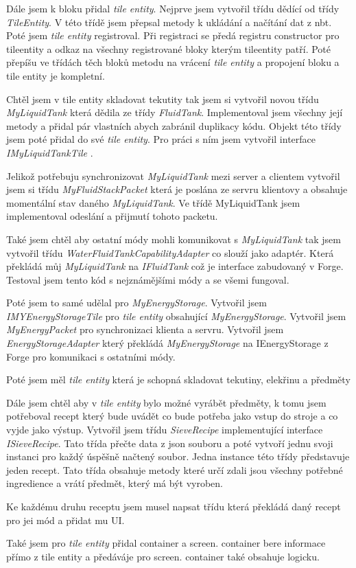 \documentclass[FM,RP]{tulthesis}
\begin{document}
\par    Dále jsem k bloku přidal \textit{tile entity}. Nejprve jsem vytvořil třídu dědící od třídy \textit{TileEntity}. V této třídě jsem přepsal metody k ukládání a načítání dat z nbt. Poté jsem \textit{tile entity} registroval. Při registraci se předá registru constructor pro tileentity a odkaz na všechny registrované bloky kterým tileentity patří. Poté přepíšu ve třídách těch bloků metodu na vrácení \textit{tile entity} a propojení bloku a tile entity je kompletní. 
\par    Chtěl jsem v tile entity skladovat tekutity tak jsem si vytvořil novou třídu  \textit{MyLiquidTank} která dědila ze třídy \textit{FluidTank}. Implementoval jsem všechny její metody a přidal pár vlastních abych zabránil duplikacy kódu. Objekt této třídy jsem poté přidal do své\textit{ tile entity}. Pro práci s ním jsem vytvořil interface \textit{IMyLiquidTankTile} . 
\par    Jelikož potřebuju synchronizovat \textit{MyLiquidTank} mezi server a clientem vytvořil jsem si třídu  \textit{MyFluidStackPacket} která je poslána ze servru klientovy a obsahuje momentální stav daného \textit{MyLiquidTank}. Ve třídě MyLiquidTank jsem implementoval odeslání a přijmutí tohoto packetu. 
 \par   Také jsem chtěl aby ostatní módy mohli komunikovat s \textit{MyLiquidTank} tak jsem vytvořil třídu \textit{WaterFluidTankCapabilityAdapter} co slouží jako adaptér. Která překládá můj  \textit{MyLiquidTank} na\textit{ IFluidTank} což je interface zabudovaný v Forge. Testoval jsem tento kód s nejznámějšími módy a se všemi fungoval.
 \par   Poté jsem to samé udělal pro \textit{MyEnergyStorage}. Vytvořil jsem  \textit{IMYEnergyStorageTile} pro \textit{tile entity} obsahující  \textit{MyEnergyStorage}.  Vytvořil jsem \textit{MyEnergyPacket} pro synchronizaci klienta a servru. Vytvořil jsem \textit{EnergyStorageAdapter} který překládá \textit{MyEnergyStorage} na IEnergyStorage z Forge pro komunikaci s ostatními módy.
\par    Poté jsem měl\textit{ tile entity} která je schopná skladovat tekutiny, elekřinu a předměty \begin{comment}
        předměty jsem nikdy nezmínil
\end{comment}
 \par   Dále jsem chtěl aby v\textit{ tile entity} bylo možné vyrábět předměty, k tomu jsem potřeboval recept který bude uvádět co bude potřeba jako vstup do stroje a co vyjde jako výstup. Vytvořil jsem třídu \textit{SieveRecipe} implementující interface \textit{ISieveRecipe}. Tato třída přečte data z json souboru a poté vytvoří jednu svoji instanci pro každý úspěšně načtený soubor. Jedna instance této třídy představuje jeden recept. Tato třída obsahuje metody které určí zdali jsou všechny potřebné ingredience a vrátí předmět, který má být vyroben.
\par    Ke každému druhu receptu jsem musel napsat třídu která překládá daný recept pro jei mód a přidat mu UI.
\par    Také jsem pro \textit{tile entity } přidal container a screen. container bere informace přímo z tile entity a předáváje pro screen. container také obsahuje logicku.
    
\end{document}

